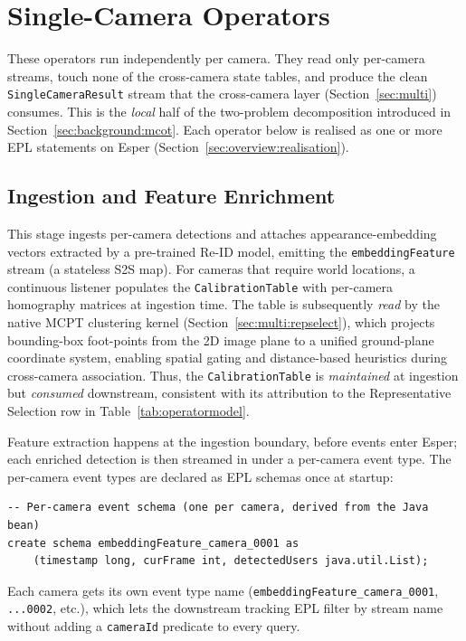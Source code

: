 \documentclass[review]{elsarticle}
\begin{document}
\section{Single-Camera Operators}
\label{sec:single}

These operators run independently per camera. They read only per-camera streams, touch none of the cross-camera state tables, and produce the clean \texttt{SingleCameraResult} stream that the cross-camera layer (Section~\ref{sec:multi}) consumes. This is the \emph{local} half of the two-problem decomposition introduced in Section~\ref{sec:background:mcot}. Each operator below is realised as one or more EPL statements on Esper (Section~\ref{sec:overview:realisation}).

\subsection{Ingestion and Feature Enrichment}
\label{sec:single:ingestion}

This stage ingests per-camera detections and attaches appearance-embedding vectors extracted by a pre-trained Re-ID model, emitting the \texttt{embeddingFeature} stream (a stateless S2S map). For cameras that require world locations, a continuous listener populates the \texttt{CalibrationTable} with per-camera homography matrices at ingestion time. The table is subsequently \emph{read} by the native MCPT clustering kernel (Section~\ref{sec:multi:repselect}), which projects bounding-box foot-points from the 2D image plane to a unified ground-plane coordinate system, enabling spatial gating and distance-based heuristics during cross-camera association. Thus, the \texttt{CalibrationTable} is \emph{maintained} at ingestion but \emph{consumed} downstream, consistent with its attribution to the Representative Selection row in Table~\ref{tab:operatormodel}.


Feature extraction happens at the ingestion boundary, before events enter Esper; each enriched detection is then streamed in under a per-camera event type. The per-camera event types are declared as EPL schemas once at startup:
\begin{verbatim}
-- Per-camera event schema (one per camera, derived from the Java bean)
create schema embeddingFeature_camera_0001 as
    (timestamp long, curFrame int, detectedUsers java.util.List);
\end{verbatim}
Each camera gets its own event type name (\texttt{embeddingFeature\_camera\_0001}, \texttt{...0002}, etc.), which lets the downstream tracking EPL filter by stream name without adding a \texttt{cameraId} predicate to every query.
\end{document}
